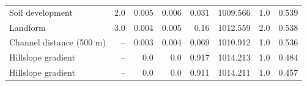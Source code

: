 \documentclass[11pt, a4paper]{article}
\begin{document}
\begin{table}[H]
\begin{tabular}{lrrrrrrr}
    Soil development & 2.0 & 0.005 & 0.006 & 0.031 & 1009.566 & 1.0 & 0.539 \\
    Landform & 3.0 & 0.004 & 0.005 & 0.16 & 1012.559 & 2.0 & 0.538 \\
    Channel distance (500 m) & -- & 0.003 & 0.004 & 0.069 & 1010.912 & 1.0 & 0.536 \\
    Hillslope gradient & -- & 0.0 & 0.0 & 0.917 & 1014.213 & 1.0 & 0.484 \\
    Hillslope gradient & -- & 0.0 & 0.0 & 0.911 & 1014.211 & 1.0 & 0.457 \\
    \bottomrule
  \end{tabular}
\end{table}
\end{document}
